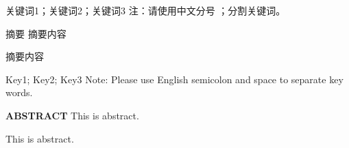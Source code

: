 
\begin{cnabstract}{关键词1；关键词2；关键词3}
  注：请使用中文分号 ；分割关键词。

  {\heiti{}摘要} 摘要内容

   摘要内容
\end{cnabstract}


\begin{enabstract}{Key1; Key2; Key3}
  Note: Please use English semicolon and space to separate key words.

  {\bfseries{}ABSTRACT} This is abstract.

  This is abstract.
\end{enabstract}
